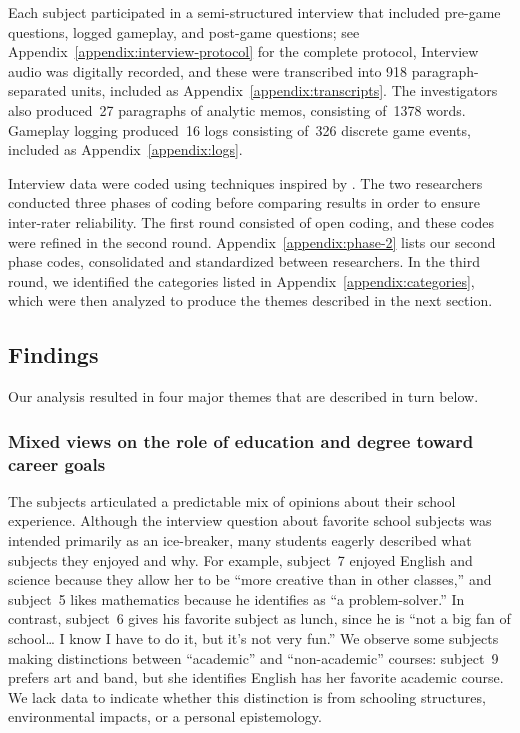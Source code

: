 \documentclass[letterpaper]{article}
\begin{document}
Each subject participated in a semi-structured interview that 
included pre-game questions, logged gameplay, and post-game questions;
see Appendix~\ref{appendix:interview-protocol} for the complete protocol,
Interview audio was digitally recorded, and these were transcribed
into 918 paragraph-separated units, 
included as Appendix~\ref{appendix:transcripts}.
The investigators also 
produced~27 paragraphs of analytic memos,
consisting of~1378 words.
Gameplay logging produced~16 logs consisting of~326 discrete game events,
included as Appendix~\ref{appendix:logs}.

Interview data were coded using techniques inspired by
\citet{Saldana2009}. The two researchers conducted three phases 
of coding before comparing results in order to ensure inter-rater
reliability. The first round consisted of open coding, and these
codes were refined in the second round. 
Appendix~\ref{appendix:phase-2} lists our second phase codes,
consolidated and standardized between researchers.
In the third round, we identified the categories listed in
Appendix~\ref{appendix:categories}, which were then analyzed
to produce the themes described in the next section.

\subsection{Findings}

Our analysis resulted in four major themes that are described in turn below.

\newcommand{\theme}[1]{\subsubsection*{#1}}

\theme{Mixed views on the role of education and degree toward career goals}

The subjects articulated a predictable mix of opinions about their
school experience. Although the interview question about favorite
school subjects was intended primarily as an ice-breaker,
many students eagerly described what subjects they enjoyed and why.
For example, subject~7 enjoyed English and science because they allow her
to be ``more creative than in other classes,'' and subject~5 likes
mathematics because he identifies as ``a problem-solver.''
In contrast, subject~6 gives his favorite subject as lunch, 
since he is ``not a big
fan of school\ldots{} I know I have to do it, but it's not very fun.''
We observe some subjects making distinctions between ``academic'' and 
``non-academic'' courses: subject~9 prefers art and band, but she identifies
English has her favorite academic course. We lack data to indicate whether
this distinction is from schooling structures, environmental impacts, 
or a personal epistemology.
\end{document}
